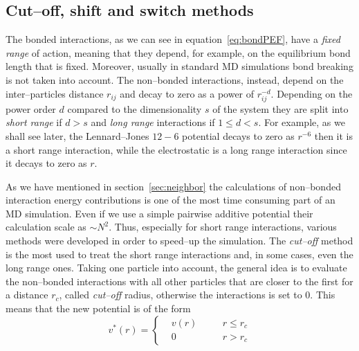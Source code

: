 \subsection{Cut--off, shift and switch methods}
The bonded interactions, as we can see in equation~\eqref{eq:bondPEF}, have a \textit{fixed range} of action, 
meaning that they depend, for example, on the equilibrium bond length that is fixed. Moreover, usually in standard 
\ac{MD} simulations bond breaking is not taken into account. The non--bonded interactions, instead, depend on the 
inter--particles distance $r_{ij}$ and decay to zero as a power of $r_{ij}^{-d}$. Depending on the power order $d$ 
compared to the dimensionality $s$ of the system they are split into \textit{short range} if $d>s$ and \textit{long 
range} interactions if $1 \le d < s$. For example, as we shall see later, the Lennard--Jones $12-6$ potential decays 
to zero as $r^{-6}$ then it is a short range interaction, while the electrostatic is a long range interaction since 
it decays to zero as $r$.

As we have mentioned in section~\ref{sec:neighbor} the calculations of non--bonded interaction energy
contributions is one of the most time consuming part of an \ac{MD} simulation. Even if we use a simple pairwise
additive potential their calculation scale as $\sim N^2$. Thus, especially for short range interactions, various
methods were developed in order to speed--up the simulation. The \textit{cut--off} method is the most used to
treat the short range interactions and, in some cases, even the long range ones. Taking one particle into
account, the general idea is to evaluate the non--bonded interactions with all other particles that are closer to
the first for a distance $r_c$, called \textit{cut--off} radius, otherwise the interactions is set to $0$. This
means that the new potential is of the form
\begin{equation*}
v^*(r) = \left \{
	\begin{aligned}
&v(r) & \quad & r \le r_c \\
&0    & \quad & r >   r_c
	\end{aligned} \right .
\end{equation*}

